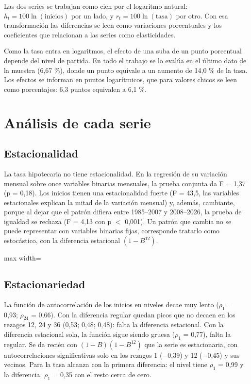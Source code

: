 \documentclass[11pt,a4paper]{article}
\newcommand{\tabla}[3]{\begin{table}[htbp]\centering\small\caption{#2}\label{#3}\begin{adjustbox}{max width=\linewidth}\end{adjustbox}\end{table}}
\begin{document}
Las dos series se trabajan como cien por el logaritmo natural: $h_t=100\ln(\text{inicios})$ por un lado, y $r_t=100\ln(\text{tasa})$ por otro. Con esa transformación las diferencias se leen como variaciones porcentuales y los coeficientes que relacionan a las series como elasticidades.

Como la tasa entra en logaritmos, el efecto de una suba de un punto porcentual depende del nivel de partida. En todo el trabajo se lo evalúa en el último dato de la muestra (6,67 \%), donde un punto equivale a un aumento de 14,0 \% de la tasa. Los efectos se informan en puntos logarítmicos, que para valores chicos se leen como porcentajes: 6,3 puntos equivalen a 6,1 \%.

\section{Análisis de cada serie}

\subsection{Estacionalidad}

La tasa hipotecaria no tiene estacionalidad. En la regresión de su variación mensual sobre once variables binarias mensuales, la prueba conjunta da F = 1,37 (p = 0,18). Los inicios tienen una estacionalidad fuerte (F = 43,5, las variables estacionales explican la mitad de la variación mensual) y, además, cambiante, porque al dejar que el patrón difiera entre 1985--2007 y 2008--2026, la prueba de igualdad se rechaza (F = 4,13 con p $<$ 0,001). Un patrón que cambia no se puede representar con variables binarias fijas, corresponde tratarlo como estocástico, con la diferencia estacional $(1-B^{12})$.

\tabla{02_estacionalidad.tex}{Estacionalidad: variables binarias mensuales y cambio de patr\'on.}{tab:estac}


\subsection{Estacionariedad}

La función de autocorrelación de los inicios en niveles decae muy lento ($\rho_1$ = 0,93; $\rho_{24}$ = 0,66). Con la diferencia regular quedan picos que no decaen en los rezagos 12, 24 y 36 (0,53; 0,48; 0,48): falta la diferencia estacional. Con la diferencia estacional sola, la función sigue siendo gruesa ($\rho_1$ = 0,77), falta la regular. Se da recién con $(1-B)(1-B^{12})$ que la serie es estacionaria, con autocorrelaciones significativas solo en los rezagos 1 ($-$0,39) y 12 ($-$0,45) y sus vecinos. Para la tasa alcanza con la primera diferencia: el nivel tiene $\rho_1$ = 0,99 y la diferencia, $\rho_1$ = 0,35 con el resto cerca de cero.
\end{document}
